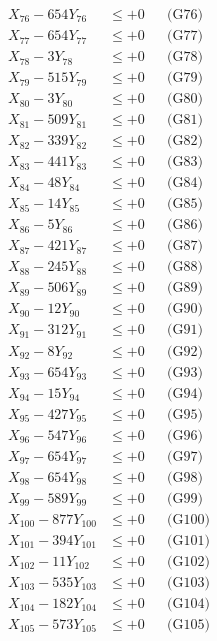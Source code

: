 \documentclass[a4paper,10pt]{article}
\begin{document}
{\begin{align}
X_{76} - 654Y_{76} &\leq +0 && \text{(G76)} \\
X_{77} - 654Y_{77} &\leq +0 && \text{(G77)} \\
X_{78} - 3Y_{78} &\leq +0 && \text{(G78)} \\
X_{79} - 515Y_{79} &\leq +0 && \text{(G79)} \\
X_{80} - 3Y_{80} &\leq +0 && \text{(G80)} \\
\allowbreak
X_{81} - 509Y_{81} &\leq +0 && \text{(G81)} \\
X_{82} - 339Y_{82} &\leq +0 && \text{(G82)} \\
X_{83} - 441Y_{83} &\leq +0 && \text{(G83)} \\
X_{84} - 48Y_{84} &\leq +0 && \text{(G84)} \\
X_{85} - 14Y_{85} &\leq +0 && \text{(G85)} \\
X_{86} - 5Y_{86} &\leq +0 && \text{(G86)} \\
X_{87} - 421Y_{87} &\leq +0 && \text{(G87)} \\
X_{88} - 245Y_{88} &\leq +0 && \text{(G88)} \\
X_{89} - 506Y_{89} &\leq +0 && \text{(G89)} \\
X_{90} - 12Y_{90} &\leq +0 && \text{(G90)} \\
\allowbreak
X_{91} - 312Y_{91} &\leq +0 && \text{(G91)} \\
X_{92} - 8Y_{92} &\leq +0 && \text{(G92)} \\
X_{93} - 654Y_{93} &\leq +0 && \text{(G93)} \\
X_{94} - 15Y_{94} &\leq +0 && \text{(G94)} \\
X_{95} - 427Y_{95} &\leq +0 && \text{(G95)} \\
X_{96} - 547Y_{96} &\leq +0 && \text{(G96)} \\
X_{97} - 654Y_{97} &\leq +0 && \text{(G97)} \\
X_{98} - 654Y_{98} &\leq +0 && \text{(G98)} \\
X_{99} - 589Y_{99} &\leq +0 && \text{(G99)} \\
X_{100} - 877Y_{100} &\leq +0 && \text{(G100)} \\
\allowbreak
X_{101} - 394Y_{101} &\leq +0 && \text{(G101)} \\
X_{102} - 11Y_{102} &\leq +0 && \text{(G102)} \\
X_{103} - 535Y_{103} &\leq +0 && \text{(G103)} \\
X_{104} - 182Y_{104} &\leq +0 && \text{(G104)} \\
X_{105} - 573Y_{105} &\leq +0 && \text{(G105)} \\

\end{align}}
\end{document}
